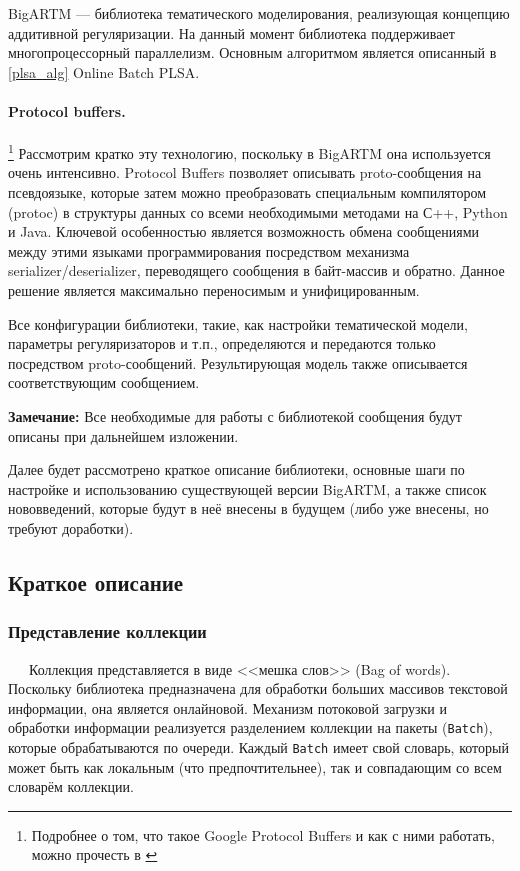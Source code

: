 BigARTM --- библиотека тематического моделирования, реализующая концепцию аддитивной регуляризации. На данный момент библиотека поддерживает многопроцессорный параллелизм. Основным алгоритмом является описанный в \ref{plsa_alg} Online Batch PLSA.

\paragraph{Protocol buffers.}
\footnote{Подробнее о том, что такое Google Protocol Buffers и как с ними работать, можно прочесть в \cite{protobuf}}
Рассмотрим кратко эту технологию, поскольку в BigARTM она используется очень интенсивно. Protocol Buffers позволяет описывать proto-сообщения на псевдоязыке, которые затем можно преобразовать специальным компилятором (protoc) в структуры данных со всеми необходимыми методами на С++, Python и Java. Ключевой особенностью является возможность обмена сообщениями между этими языками программирования посредством механизма serializer/deserializer, переводящего сообщения в байт-массив и обратно. Данное решение является максимально переносимым и унифицированным.

Все конфигурации библиотеки, такие, как настройки тематической модели, параметры регуляризаторов и т.п., определяются и передаются только посредством proto-сообщений. Результирующая модель также описывается соответствующим сообщением. 

{\bf Замечание:} Все необходимые для работы с библиотекой сообщения будут описаны при дальнейшем изложении.

Далее будет рассмотрено краткое описание библиотеки, основные шаги по настройке и использованию существующей версии BigARTM, а также список нововведений, которые будут в неё внесены в будущем (либо уже внесены, но требуют доработки).

\subsection{Краткое описание}

\subsubsection{Представление коллекции} 
$\quad\;\:$Коллекция представляется в виде <<мешка слов>> (Bag of words). Поскольку библиотека предназначена для обработки больших массивов текстовой информации, она является онлайновой. Механизм потоковой загрузки и обработки информации реализуется разделением коллекции на пакеты (\verb|Batch|), которые обрабатываются по очереди. Каждый \verb|Batch| имеет свой словарь, который может быть как локальным (что предпочтительнее), так и совпадающим со всем словарём коллекции. 

